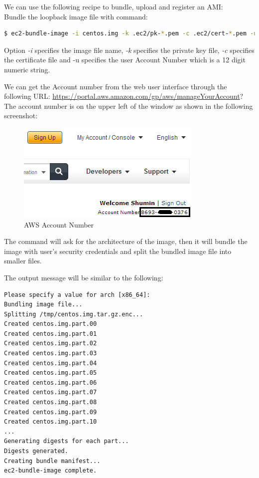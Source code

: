 We can use the following recipe to bundle, upload and register an AMI: \\
Bundle the loopback image file with command:
\lstset{style=bashstyle}
\begin{lstlisting}[language=bash]
$ ec2-bundle-image -i centos.img -k .ec2/pk-*.pem -c .ec2/cert-*.pem -u 123412341234
\end{lstlisting}

Option \emph{-i} specifies the image file name, \emph{-k} specifies the private key file, \emph{-c} specifies the certificate file and -u specifies the user Account Number which is a 12 digit numeric string.

We can get the Account number from the web user interface through the following URL: \url{https://portal.aws.amazon.com/gp/aws/manageYourAccount}? The account number is on the upper left of the window as shown in the following screenshot:
\begin{figure}[ht]
  \centering
  \includegraphics[width=.50\textwidth]{figs/5163os_08_16.png}
  \caption{AWS Account Number}\label{fig:aws.account.number}
\end{figure} 
The command will ask for the architecture of the image, then it will bundle the image with user's security credentials and split the bundled image file into smaller files.

The output message will be similar to the following:
\lstset{style=bashstyle}
\begin{lstlisting}
Please specify a value for arch [x86_64]:
Bundling image file...
Splitting /tmp/centos.img.tar.gz.enc...
Created centos.img.part.00
Created centos.img.part.01
Created centos.img.part.02
Created centos.img.part.03
Created centos.img.part.04
Created centos.img.part.05
Created centos.img.part.06
Created centos.img.part.07
Created centos.img.part.08
Created centos.img.part.09
Created centos.img.part.10
...
Generating digests for each part...
Digests generated.
Creating bundle manifest...
ec2-bundle-image complete.
\end{lstlisting}

